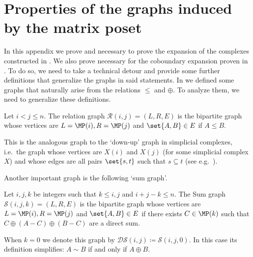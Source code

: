 \section{Properties of the graphs induced by the matrix poset} \label{app:proofs-of-expansion-matrix-graphs}
In this appendix we prove  and  necessary to prove the expansion of the complexes constructed in . We also prove  necessary for the coboundary expansion proven in . To do so, we need to take a technical detour and provide some further definitions that generalize the graphs in said statements.
In  we defined some graphs that naturally arise from the relations \(\leq\) and \(\oplus\). To analyze them, we need to generalize these definitions.

\begin{definition}
    Let \(i < j \leq n\). The relation graph \(\mathcal{R}(i,j) = (L,R,E)\) is the bipartite graph whose vertices are \(L=\MP(i), R=\MP(j)\) and \(\set{A,B} \in E\) if \(A \leq B\).
\end{definition}
This is the analogous graph to the `down-up' graph in simplicial complexes, i.e.\ the graph whose vertices are \(X(i)\) and \(X(j)\) (for some simplicial complex \(X\)) and whose edges are all pairs \(\set{s,t}\) such that \(s \subseteq t\) (see e.g.\ \cite{DinurK2017}).


Another important graph is the following `sum graph'.
\begin{definition}
    Let \(i,j,k\) be integers such that \(k \leq i,j\) and \(i+j-k \leq n\). The Sum graph \(\mathcal{S}(i,j,k) = (L,R,E)\) is the bipartite graph whose vertices are \(L=\MP(i), R=\MP(j)\) and \(\set{A,B} \in E\) if there exists \(C \in \MP(k)\) such that \(C \oplus (A-C) \oplus (B-C)\) are a direct sum.
\end{definition}
When \(k=0\) we denote this graph by \(\mathcal{DS}(i,j) \coloneqq \mathcal{S}(i,j,0)\). In this case its definition simplifies: \(A \sim B\) if and only if \(A \oplus B\).


